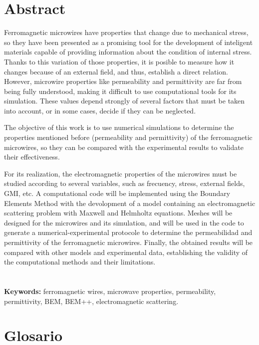 \documentclass[12pt,letterpaper]{article}
\numberwithin{equation}{section}
\begin{document}
\pagebreak
\section*{Abstract}

Ferromagnetic microwires have properties that change due to mechanical stress, so they have been presented as a promising tool for the development of inteligent materials capable of providing information about the condition of internal stress. Thanks to this variation of those properties, it is posible to measure how it changes because of an external field, and thus, establish a direct relation. However, microwire properties like permeability and permittivity are far from being fully understood, making it difficult to use computational tools for its simulation. These values depend strongly of several factors that must be taken into account, or in some cases, decide if they can be neglected.

The objective of this work is to use numerical simulations to determine the properties mentioned before (permeability and permittivity) of the ferromagnetic microwires, so they can be compared with the experimental results to validate their effectiveness.

For its realization, the electromagnetic properties of the microwires must be studied according to several variables, such as frecuency, stress, external fields, GMI, etc. A computational code will be implemented using the Boundary Elements Method with the devolopment of a model containing an electromagnetic scattering problem with Maxwell and Helmholtz equations. Meshes will be designed for the microwires and its simulation, and will be used in the code to generate a numerical-experimental protocole to determine the permeabilidad and permittivity of the ferromagnetic microwires. Finally, the obtained results will be compared with other models and experimental data, 	establishing the validity of the computational methods and their limitations.
 \\
 \\
 \\

\noindent \textbf{Keywords:} ferromagnetic wires, microwave properties, permeability, permittivity, BEM, BEM++, electromagnetic scattering.


\pagebreak
\section*{Glosario}
\end{document}
